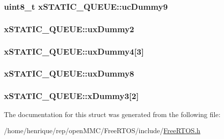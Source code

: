 \hypertarget{structxSTATIC__QUEUE_a9442f864adb35e210702e0657a5a7a7b}{
\subsubsection[{uc\-Dummy9}]{\setlength{\rightskip}{0pt plus 5cm}uint8\-\_\-t x\-S\-T\-A\-T\-I\-C\-\_\-\-Q\-U\-E\-U\-E\-::uc\-Dummy9}}\label{structxSTATIC__QUEUE_a9442f864adb35e210702e0657a5a7a7b}
\hypertarget{structxSTATIC__QUEUE_ab4e6a2a0bb59ba54d05927e99afd553f}{
\subsubsection[{ux\-Dummy2}]{ x\-S\-T\-A\-T\-I\-C\-\_\-\-Q\-U\-E\-U\-E\-::ux\-Dummy2}}\label{structxSTATIC__QUEUE_ab4e6a2a0bb59ba54d05927e99afd553f}
\hypertarget{structxSTATIC__QUEUE_a502854697731754ce445f6503d14b127}{
\subsubsection[{ux\-Dummy4}]{ x\-S\-T\-A\-T\-I\-C\-\_\-\-Q\-U\-E\-U\-E\-::ux\-Dummy4\mbox{[}3\mbox{]}}}\label{structxSTATIC__QUEUE_a502854697731754ce445f6503d14b127}
\hypertarget{structxSTATIC__QUEUE_a9c763680025a3205671239a3a535d22d}{
\subsubsection[{ux\-Dummy8}]{ x\-S\-T\-A\-T\-I\-C\-\_\-\-Q\-U\-E\-U\-E\-::ux\-Dummy8}}\label{structxSTATIC__QUEUE_a9c763680025a3205671239a3a535d22d}
\hypertarget{structxSTATIC__QUEUE_add0de93e08b632124122850bcd543597}{
\subsubsection[{x\-Dummy3}]{ x\-S\-T\-A\-T\-I\-C\-\_\-\-Q\-U\-E\-U\-E\-::x\-Dummy3\mbox{[}2\mbox{]}}}\label{structxSTATIC__QUEUE_add0de93e08b632124122850bcd543597}


The documentation for this struct was generated from the following file\-:\begin{DoxyCompactItemize}
\item 
/home/henrique/rep/open\-M\-M\-C/\-Free\-R\-T\-O\-S/include/\hyperlink{FreeRTOS_8h}{Free\-R\-T\-O\-S.\-h}\end{DoxyCompactItemize}
